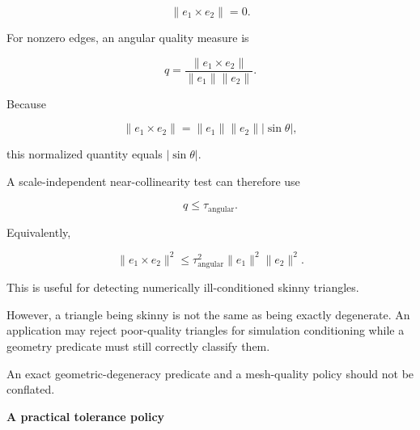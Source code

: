 \[
\|e_1\times e_2\|=0.
\]

For nonzero edges, an angular quality measure is

\[
q=\frac{\|e_1\times e_2\|} {\|e_1\|\|e_2\|}.
\]

Because

\[
\|e_1\times e_2\| =\|e_1\|\|e_2\||\sin\theta|,
\]

this normalized quantity equals \(|\sin\theta|\).

A scale-independent near-collinearity test can therefore use

\[
q\le\tau_{\text{angular}}.
\]

Equivalently,

\[
\|e_1\times e_2\|^2 \le \tau_{\text{angular}}^2 \|e_1\|^2\|e_2\|^2.
\]

This is useful for detecting numerically ill-conditioned skinny triangles.

However, a triangle being skinny is not the same as being exactly degenerate. An application may reject poor-quality triangles for simulation conditioning while a geometry predicate must still correctly classify them.

An exact geometric-degeneracy predicate and a mesh-quality policy should not be conflated.

\textbf{A practical tolerance policy}

